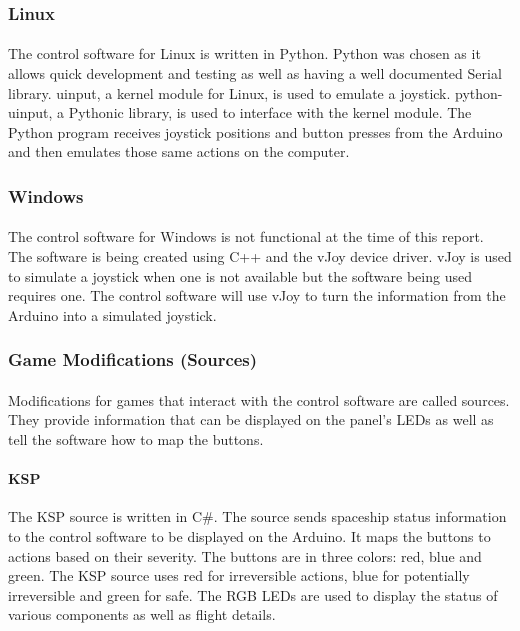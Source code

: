 \documentclass[12pt,a4paper]{article}
\begin{document}
\subsubsection{Linux}
\paragraph{}
The control software for Linux is written in Python. Python was chosen as it allows quick development and testing as well as having a well documented Serial library. uinput, a kernel module for Linux, is used to emulate a joystick. python-uinput, a Pythonic library, is used to interface with the kernel module. The Python program receives joystick positions and button presses from the Arduino and then emulates those same actions on the computer.
\subsubsection{Windows}
\paragraph{}
The control software for Windows is not functional at the time of this report. The software is being created using C++ and the vJoy device driver. vJoy is used to simulate a joystick when one is not available but the software being used requires one. The control software will use vJoy to turn the information from the Arduino into a simulated joystick.
\subsubsection{Game Modifications (Sources)}
\paragraph{}
Modifications for games that interact with the control software are called sources. They provide information that can be displayed on the panel's \glspl{LED} as well as tell the software how to map the buttons.
\paragraph{\gls{KSP}}
The \gls{KSP} source is written in C\#. The source sends spaceship status information to the control software to be displayed on the Arduino. It maps the buttons to actions based on their severity. The buttons are in three colors: red, blue and green. The \gls{KSP} source uses red for irreversible actions, blue for potentially irreversible and green for safe. The \gls{RGB} \glspl{LED} are used to display the status of various components as well as flight details.
\end{document}
